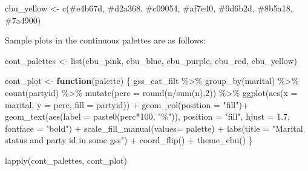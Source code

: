 \documentclass[
  letterpaper,
  DIV=11,
  numbers=noendperiod]{scrreprt}
\newenvironment{Shaded}{\begin{snugshade}}{\end{snugshade}}
\newcommand{\AttributeTok}[1]{\textcolor[rgb]{0.40,0.45,0.13}{#1}}
\newcommand{\ControlFlowTok}[1]{\textcolor[rgb]{0.00,0.23,0.31}{\textbf{#1}}}
\newcommand{\DecValTok}[1]{\textcolor[rgb]{0.68,0.00,0.00}{#1}}
\newcommand{\FloatTok}[1]{\textcolor[rgb]{0.68,0.00,0.00}{#1}}
\newcommand{\FunctionTok}[1]{\textcolor[rgb]{0.28,0.35,0.67}{#1}}
\newcommand{\NormalTok}[1]{\textcolor[rgb]{0.00,0.23,0.31}{#1}}
\newcommand{\OtherTok}[1]{\textcolor[rgb]{0.00,0.23,0.31}{#1}}
\newcommand{\SpecialCharTok}[1]{\textcolor[rgb]{0.37,0.37,0.37}{#1}}
\newcommand{\StringTok}[1]{\textcolor[rgb]{0.13,0.47,0.30}{#1}}
\begin{document}
\begin{Shaded}
\begin{Highlighting}[]
\NormalTok{cbu\_yellow }\OtherTok{\textless{}{-}} \FunctionTok{c}\NormalTok{(}\StringTok{\textquotesingle{}\#e4b67d\textquotesingle{}}\NormalTok{, }\StringTok{\textquotesingle{}\#d2a368\textquotesingle{}}\NormalTok{, }\StringTok{\textquotesingle{}\#c09054\textquotesingle{}}\NormalTok{, }\StringTok{\textquotesingle{}\#af7e40\textquotesingle{}}\NormalTok{, }\StringTok{\textquotesingle{}\#9d6b2d\textquotesingle{}}\NormalTok{, }\StringTok{\textquotesingle{}\#8b5a18\textquotesingle{}}\NormalTok{, }\StringTok{\textquotesingle{}\#7a4900\textquotesingle{}}\NormalTok{)}
\end{Highlighting}
\end{Shaded}

Sample plots in the continuous palettes are as follows:

\begin{Shaded}
\begin{Highlighting}[]
\NormalTok{cont\_palettes }\OtherTok{\textless{}{-}} \FunctionTok{list}\NormalTok{(cbu\_pink, cbu\_blue, cbu\_purple, cbu\_red, cbu\_yellow)}


\NormalTok{cont\_plot }\OtherTok{\textless{}{-}} \ControlFlowTok{function}\NormalTok{(palette) \{}
\NormalTok{  gss\_cat\_filt }\SpecialCharTok{\%\textgreater{}\%}
  \FunctionTok{group\_by}\NormalTok{(marital) }\SpecialCharTok{\%\textgreater{}\%}
  \FunctionTok{count}\NormalTok{(partyid) }\SpecialCharTok{\%\textgreater{}\%}
  \FunctionTok{mutate}\NormalTok{(}\AttributeTok{perc =} \FunctionTok{round}\NormalTok{(n}\SpecialCharTok{/}\FunctionTok{sum}\NormalTok{(n),}\DecValTok{2}\NormalTok{)) }\SpecialCharTok{\%\textgreater{}\%}
  \FunctionTok{ggplot}\NormalTok{(}\FunctionTok{aes}\NormalTok{(}\AttributeTok{x =}\NormalTok{ marital, }\AttributeTok{y =}\NormalTok{ perc, }\AttributeTok{fill =}\NormalTok{ partyid)) }\SpecialCharTok{+}
  \FunctionTok{geom\_col}\NormalTok{(}\AttributeTok{position =} \StringTok{"fill"}\NormalTok{)}\SpecialCharTok{+}
  \FunctionTok{geom\_text}\NormalTok{(}\FunctionTok{aes}\NormalTok{(}\AttributeTok{label =} \FunctionTok{paste0}\NormalTok{(perc}\SpecialCharTok{*}\DecValTok{100}\NormalTok{, }\StringTok{"\%"}\NormalTok{)), }\AttributeTok{position =} \StringTok{"fill"}\NormalTok{, }\AttributeTok{hjust =} \FloatTok{1.7}\NormalTok{, }\AttributeTok{fontface =} \StringTok{"bold"}\NormalTok{) }\SpecialCharTok{+}
  \FunctionTok{scale\_fill\_manual}\NormalTok{(}\AttributeTok{values=}\NormalTok{ palette) }\SpecialCharTok{+}
  \FunctionTok{labs}\NormalTok{(}\AttributeTok{title =} \StringTok{"Marital status and party id in some gss"}\NormalTok{) }\SpecialCharTok{+}
  \FunctionTok{coord\_flip}\NormalTok{() }\SpecialCharTok{+}
  \FunctionTok{theme\_cbu}\NormalTok{()}
\NormalTok{\}}

\FunctionTok{lapply}\NormalTok{(cont\_palettes, cont\_plot)}
\end{Highlighting}
\end{Shaded}
\end{document}
